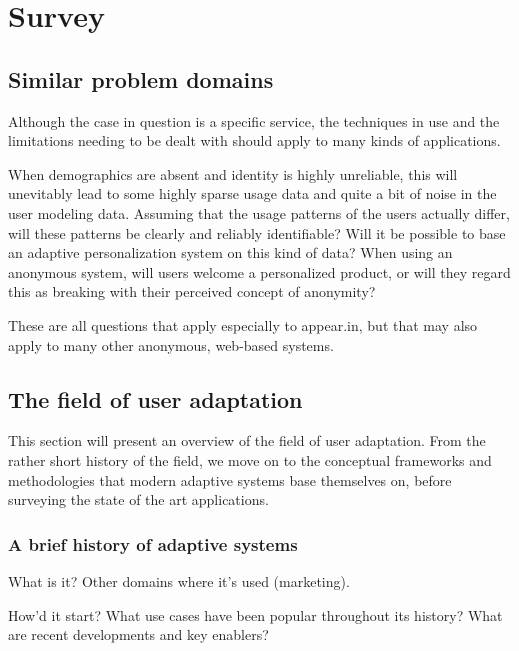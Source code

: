 \chapter{Survey}

\label{Chapter2}


\section{Similar problem domains} %
\label{sec:similar_problem_domains}

Although the case in question is a specific service, the techniques in use and the limitations needing to be dealt with should apply to many kinds of applications.

When demographics are absent and identity is highly unreliable, this will unevitably lead to some highly sparse usage data and quite a bit of noise in the user modeling data.
Assuming that the usage patterns of the users actually differ, will these patterns be clearly and reliably identifiable?
Will it be possible to base an adaptive personalization system on this kind of data?
When using an anonymous system, will users welcome a personalized product, or will they regard this as breaking with their perceived concept of anonymity?

These are all questions that apply especially to appear.in, but that may also apply to many other anonymous, web-based systems.

\section{The field of user adaptation}
\label{sec:user_adaptation_survey}

This section will present an overview of the field of user adaptation. From the rather short history of the field, we move on to the conceptual frameworks and methodologies that modern adaptive systems base themselves on, before surveying the state of the art applications.

\subsection{A brief history of adaptive systems}

What is it? Other domains where it's used (marketing).

How'd it start? What use cases have been popular throughout its history? What are recent developments and key enablers?

